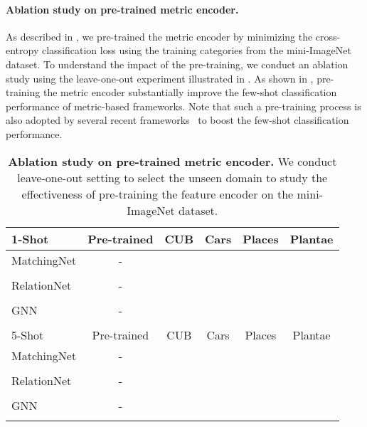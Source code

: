 \paragraph{Ablation study on pre-trained metric encoder.}
As described in , we pre-trained the metric encoder  by minimizing the cross-entropy classification loss using the  training categories from the mini-ImageNet dataset.
To understand the impact of the pre-training, we conduct an ablation study using the leave-one-out experiment illustrated in .
As shown in , pre-training the metric encoder  substantially improve the few-shot classification performance of metric-based frameworks.
Note that such a pre-training process is also adopted by several recent frameworks~\citep{rusu2018leo,gidaris2018dynamic,lifchitz2019dense} to boost the few-shot classification performance.
\begin{table}[t]\footnotesize
	\centering
	\caption{\textbf{Ablation study on pre-trained metric encoder.} We conduct leave-one-out setting to select the unseen domain to study the effectiveness of pre-training the feature encoder  on the mini-ImageNet dataset.}
	\begin{tabular}{@{}l c cccc@{}} 
	    \toprule
	    1-Shot & Pre-trained & CUB & Cars & Places & Plantae \\
		\midrule
		MatchingNet & - & 
		 &  &  &  \\
	    & \checkmark & 
		 &  &  &  \\
		\midrule
		RelationNet & - & 
		 &  &  &  \\
		& \checkmark & 
		 &  &  &  \\
		\midrule
		GNN & - & 
		 &  &  &  \\
		& \checkmark & 
		 &  &  &  \\
	    \midrule
	    \midrule
		5-Shot & Pre-trained & CUB & Cars & Places & Plantae \\
		\midrule
		MatchingNet & - & 
		 &  &  &  \\
		& \checkmark & 
		 &  &  &  \\
		\midrule
		RelationNet & - & 
		 &  &  &  \\
		& \checkmark & 
		 &  &  &  \\
		\midrule
		GNN & - & 
		 &  &  &  \\
		& \checkmark & 
		 &  &  & \\
		\bottomrule 
	\end{tabular}
	\label{tab:ablation_pretrain}
\end{table}


